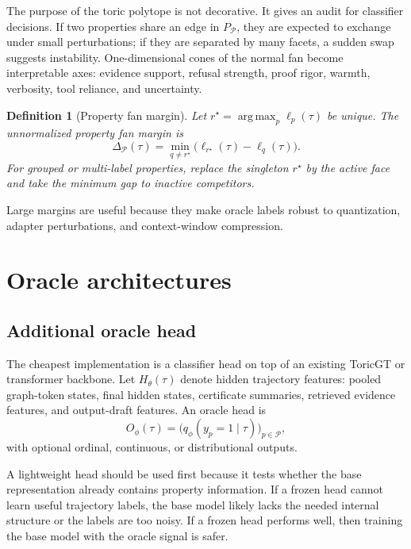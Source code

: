 \documentclass[11pt]{article}
\newtheorem{definition}[theorem]{Definition}
\newcommand{\calP}{\mathcal{P}}
\newcommand{\argmax}{\operatorname*{arg\,max}}
\numberwithin{equation}{section}
\begin{document}
The purpose of the toric polytope is not decorative. It gives an audit for classifier decisions. If two properties share an edge in $P_\calP$, they are expected to exchange under small perturbations; if they are separated by many facets, a sudden swap suggests instability. One-dimensional cones of the normal fan become interpretable axes: evidence support, refusal strength, proof rigor, warmth, verbosity, tool reliance, and uncertainty.

\begin{definition}[Property fan margin]
Let $r^\star=\argmax_p\ell_p(\tau)$ be unique. The unnormalized property fan margin is
\begin{equation}
\Delta_{\calP}(\tau)=\min_{q\ne r^\star}\bigl(\ell_{r^\star}(\tau)-\ell_q(\tau)\bigr).
\end{equation}
For grouped or multi-label properties, replace the singleton $r^\star$ by the active face and take the minimum gap to inactive competitors.
\end{definition}

Large margins are useful because they make oracle labels robust to quantization, adapter perturbations, and context-window compression.

\section{Oracle architectures}
\subsection{Additional oracle head}
The cheapest implementation is a classifier head on top of an existing ToricGT or transformer backbone. Let $H_\theta(\tau)$ denote hidden trajectory features: pooled graph-token states, final hidden states, certificate summaries, retrieved evidence features, and output-draft features. An oracle head is
\begin{equation}
O_\phi(\tau)=\bigl(q_\phi(y_p=1\mid \tau)\bigr)_{p\in\calP},
\end{equation}
with optional ordinal, continuous, or distributional outputs.

A lightweight head should be used first because it tests whether the base representation already contains property information. If a frozen head cannot learn useful trajectory labels, the base model likely lacks the needed internal structure or the labels are too noisy. If a frozen head performs well, then training the base model with the oracle signal is safer.
\end{document}
